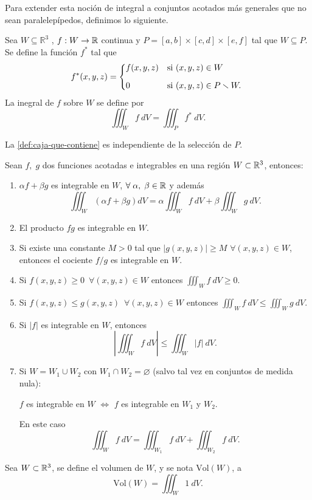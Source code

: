 
Para extender esta noci\'on de integral a  conjuntos acotados m\'as generales que no sean  paralelepípedos, definimos lo siguiente. 

\begin{definition}\label{def:caja-que-contiene} Sea $W  \subseteq  \mathbb{R}^3$ , $f:W\to\mathbb{R}$ continua y  $P = [a, b] \times [c, d] \times [e, f]$ tal que $W  \subseteq  P$.  Se define la funci\'on $f^*$ tal que
\[
    f^*(x,y,z)=
    \begin{dcases*}
        f(x,y,z) & si $(x,y,z)\in W$ \\[.2cm]
        0        & si $(x,y,z)\in P\smallsetminus W.$
    \end{dcases*}
\]
La inegral de  $f$ sobre $W$ se define por 
\[
    \iiint_W f\:dV=\iiint_P f^*\:dV.  
\]
\end{definition}

\begin{obs} 
   La \autoref{def:caja-que-contiene} es independiente de la selecci\'on de $P$.
\end{obs}

\begin{propertie}
    Sean $f,\;g$ dos funciones acotadas e integrables en una regi\'on $W\subset\mathbb{R}^3$, entonces:
    \begin{enumerate}
        \item[i.] $\alpha f+\beta g$ es integrable en $W$, $\forall\;\alpha,\;\beta\in\mathbb{R}$ y adem\'as
        \[
            \iiint_W \left(\alpha f+\beta g\right)dV=\alpha\iiint_W f\:dV+\beta\iiint_W g\:dV.
        \]
        \item[ii.] El producto $fg$ es integrable en $W$.
        \item[iii.]Si existe una constante \(M > 0\) tal que \(\vert{}g(x,y,z)\vert{} \geq M\) \(\forall(x,y,z)\in W\), entonces el cociente \(f/g\) es integrable en \(W\).
        \item[iv.] Si $f(x,y,z) \geq 0  \;\: \forall(x,y,z)\in W$ entonces  $\iiint_W f\:dV\geq0$.
        \item[v.]Si $f(x,y,z) \leq g(x,y,z) \;\: \forall(x,y,z)\in W$ entonces $\iiint_W f\:dV\leq\iiint_W g\:dV.$
        \item[vi.]Si $|f|$ es integrable en $W$, entonces 
        \[
            \left|\iiint_W f\:dV\right|\leq\iiint_W|f|\:dV.  
        \]    
        \item[vii.] Si $W=W_1\cup W_2$  con $W_1\cap W_2 = \varnothing$  (salvo tal vez en conjuntos de medida nula): 
        
        $f$ es integrable en $W$ $\iff$ $f$ es integrable en $W_1$ y $W_2$.
        
         En este caso 
        \[
            \iiint_W f\:dV=\iiint_{W_1} f\:dV+\iiint_{W_2}f\:dV.    
        \]
    \end{enumerate}
\end{propertie}

\begin{definition} Sea $W\subset\mathbb{R}^3$,  se define el volumen de $W$,  y se nota $\text{Vol}(W)$,  a  
\label{def:vol_solido}
    \[
        \text{Vol}(W)=\iiint_W 1 \:dV.
    \]
\end{definition}
